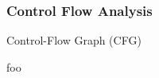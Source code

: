 
\subsubsection{Control Flow Analysis}
\label{sec:control_flow_analysis}

Control-Flow Graph (CFG)

foo


\begin{figure}[htbp]
	\centering
	\begin{subfigure}[ht]{0.23\textwidth}
		\centering
		\begin{subfigure}[ht]{0.45\textwidth}
			
		\end{subfigure}
		\begin{subfigure}[ht]{0.42\textwidth}

\end{subfigure}
\end{subfigure}
\end{figure}
